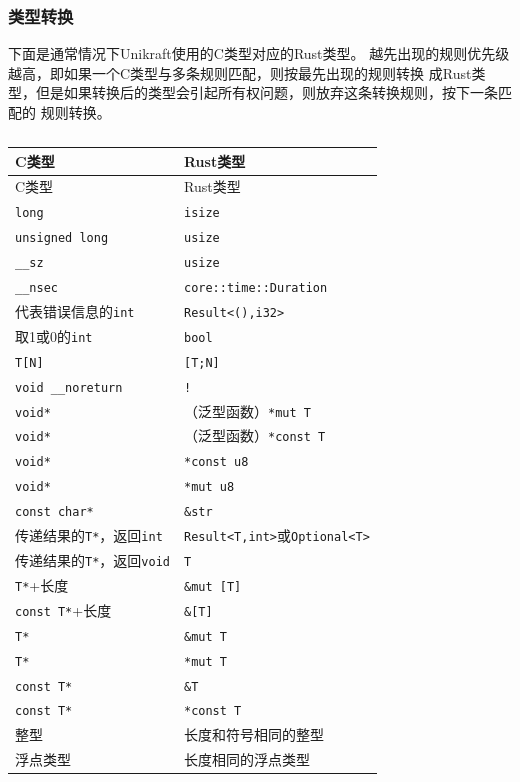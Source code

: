\documentclass{../runikraft-report}
\begin{document}
\subsubsection{类型转换}
下面是通常情况下Unikraft使用的C类型对应的Rust类型。
越先出现的规则优先级越高，即如果一个C类型与多条规则匹配，则按最先出现的规则转换
成Rust类型，但是如果转换后的类型会引起所有权问题，则放弃这条转换规则，按下一条匹配的
规则转换。
\begin{longtable}{|l|l|}
\caption{}\\
\hline
C类型&Rust类型\\\hline
\endfirsthead
\hline
C类型&Rust类型\\\hline
\endhead
\texttt{long}&\texttt{isize}\\\hline
\texttt{unsigned long}&\texttt{usize}\\\hline
\texttt{\_\_sz}&\texttt{usize}\\\hline
\texttt{\_\_nsec}&\texttt{core::time::Duration}\\\hline
代表错误信息的\texttt{int}&\texttt{Result<(),i32>}\\\hline
取1或0的\texttt{int}&\texttt{bool}\\\hline
\texttt{T[N]}&\texttt{[T;N]}\\\hline
\texttt{void \_\_noreturn}&\texttt{!}\\\hline
\texttt{void*}&（泛型函数）\texttt{*mut T}\\\hline
\texttt{void*}&（泛型函数）\texttt{*const T}\\\hline
\texttt{void*}&\texttt{*const u8}\\\hline
\texttt{void*}&\texttt{*mut u8}\\\hline
\texttt{const char*}&\texttt{\&str}\\\hline
传递结果的\texttt{T*}，返回\texttt{int}&\texttt{Result<T,int>}或\texttt{Optional<T>}\\\hline
传递结果的\texttt{T*}，返回\texttt{void}&\texttt{T}\\\hline
\texttt{T*}+\hspace{0cm}长度&\texttt{\&mut [T]}\\\hline
\texttt{const T*}+\hspace{0cm}长度&\texttt{\&[T]}\\\hline
\texttt{T*}&\texttt{\&mut T}\\\hline
\texttt{T*}&\texttt{*mut T}\\\hline
\texttt{const T*}&\texttt{\&T}\\\hline
\texttt{const T*}&\texttt{*const T}\\\hline
整型&长度和符号相同的整型\\\hline
浮点类型&长度相同的浮点类型\\\hline
\end{longtable}
\end{document}
